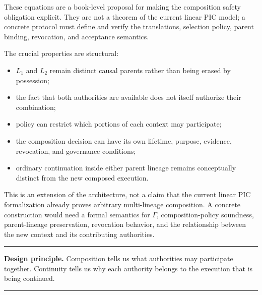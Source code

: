 \documentclass[10pt,oneside,openany]{book}
\newcommand{\principle}[1]{%
  \vspace{4pt}
  \noindent\begin{minipage}{\linewidth}
  \hrule\vspace{5pt}
  \small\sffamily\raggedright\textbf{Design principle.} #1
  \vspace{5pt}\hrule
  \end{minipage}\vspace{4pt}
}
\begin{document}
These equations are a book-level proposal for making the composition safety obligation explicit. They are not a theorem of the current linear PIC model; a concrete protocol must define and verify the translations, selection policy, parent binding, revocation, and acceptance semantics.

The crucial properties are structural:
\begin{itemize}
\item $L_1$ and $L_2$ remain distinct causal parents rather than being erased by possession;
\item the fact that both authorities are available does not itself authorize their combination;
\item policy can restrict which portions of each context may participate;
\item the composition decision can have its own lifetime, purpose, evidence, revocation, and governance conditions;
\item ordinary continuation inside either parent lineage remains conceptually distinct from the new composed execution.
\end{itemize}

This is an extension of the architecture, not a claim that the current linear PIC formalization already proves arbitrary multi-lineage composition. A concrete construction would need a formal semantics for $\Gamma$, composition-policy soundness, parent-lineage preservation, revocation behavior, and the relationship between the new context and its contributing authorities.

\begin{center}
\end{center}

\principle{Composition tells us what authorities may participate together. Continuity tells us why each authority belongs to the execution that is being continued.}
\end{document}
